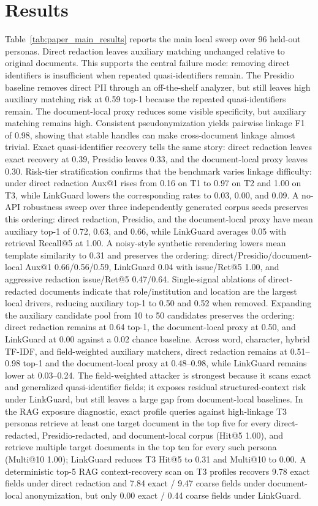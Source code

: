 \documentclass[10pt,twocolumn]{article}
\newcommand{\method}{LinkGuard}
\begin{document}
\section{Results}
Table~\ref{tab:paper_main_results} reports the main local sweep over 96 held-out personas.
Direct redaction leaves auxiliary matching unchanged relative to original documents.
This supports the central failure mode: removing direct identifiers is insufficient when repeated quasi-identifiers remain.
The Presidio baseline removes direct PII through an off-the-shelf analyzer, but still leaves high auxiliary matching risk at 0.59 top-1 because the repeated quasi-identifiers remain.
The document-local proxy reduces some visible specificity, but auxiliary matching remains high.
Consistent pseudonymization yields pairwise linkage F1 of 0.98, showing that stable handles can make cross-document linkage almost trivial.
Exact quasi-identifier recovery tells the same story: direct redaction leaves exact recovery at 0.39, Presidio leaves 0.33, and the document-local proxy leaves 0.30.
Risk-tier stratification confirms that the benchmark varies linkage difficulty: under direct redaction Aux@1 rises from 0.16 on T1 to 0.97 on T2 and 1.00 on T3, while \method{} lowers the corresponding rates to 0.03, 0.00, and 0.09.
A no-API robustness sweep over three independently generated corpus seeds preserves this ordering: direct redaction, Presidio, and the document-local proxy have mean auxiliary top-1 of 0.72, 0.63, and 0.66, while \method{} averages 0.05 with retrieval Recall@5 at 1.00.
A noisy-style synthetic rerendering lowers mean template similarity to 0.31 and preserves the ordering: direct/Presidio/document-local Aux@1 0.66/0.56/0.59, \method{} 0.04 with issue/Ret@5 1.00, and aggressive redaction issue/Ret@5 0.47/0.64.
Single-signal ablations of direct-redacted documents indicate that role/institution and location are the largest local drivers, reducing auxiliary top-1 to 0.50 and 0.52 when removed.
Expanding the auxiliary candidate pool from 10 to 50 candidates preserves the ordering: direct redaction remains at 0.64 top-1, the document-local proxy at 0.50, and \method{} at 0.00 against a 0.02 chance baseline.
Across word, character, hybrid TF-IDF, and field-weighted auxiliary matchers, direct redaction remains at 0.51--0.98 top-1 and the document-local proxy at 0.48--0.98, while \method{} remains lower at 0.03--0.24.
The field-weighted attacker is strongest because it scans exact and generalized quasi-identifier fields; it exposes residual structured-context risk under \method{}, but still leaves a large gap from document-local baselines.
In the RAG exposure diagnostic, exact profile queries against high-linkage T3 personas retrieve at least one target document in the top five for every direct-redacted, Presidio-redacted, and document-local corpus (Hit@5 1.00), and retrieve multiple target documents in the top ten for every such persona (Multi@10 1.00); \method{} reduces T3 Hit@5 to 0.31 and Multi@10 to 0.00.
A deterministic top-5 RAG context-recovery scan on T3 profiles recovers 9.78 exact fields under direct redaction and 7.84 exact / 9.47 coarse fields under document-local anonymization, but only 0.00 exact / 0.44 coarse fields under \method{}.
\end{document}
